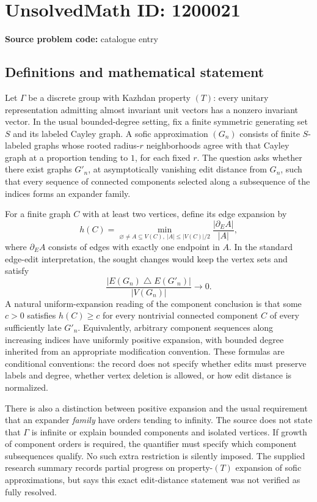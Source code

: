 \documentclass[11pt]{article}
\begin{document}
\section*{UnsolvedMath ID: 1200021}
\textbf{Source problem code:} catalogue entry
\subsection{Definitions and mathematical statement}
Let \(\Gamma\) be a discrete group with Kazhdan property \((T)\): every unitary representation admitting almost invariant unit vectors has a nonzero invariant vector. In the usual bounded-degree setting, fix a finite symmetric generating set \(S\) and its labeled Cayley graph. A sofic approximation \((G_n)\) consists of finite \(S\)-labeled graphs whose rooted radius-\(r\) neighborhoods agree with that Cayley graph at a proportion tending to \(1\), for each fixed \(r\). The question asks whether there exist graphs \(G'_n\), at asymptotically vanishing edit distance from \(G_n\), such that every sequence of connected components selected along a subsequence of the indices forms an expander family.

For a finite graph \(C\) with at least two vertices, define its edge expansion by
\[
h(C)=\min_{\varnothing\ne A\subseteq V(C),\ |A|\le |V(C)|/2}
\frac{|\partial_E A|}{|A|},
\]
where \(\partial_E A\) consists of edges with exactly one endpoint in \(A\). In the standard edge-edit interpretation, the sought changes would keep the vertex sets and satisfy
\[
\frac{|E(G_n)\mathbin{\triangle}E(G'_n)|}{|V(G_n)|}\longrightarrow0.
\]
A natural uniform-expansion reading of the component conclusion is that some \(c>0\) satisfies \(h(C)\ge c\) for every nontrivial connected component \(C\) of every sufficiently late \(G'_n\). Equivalently, arbitrary component sequences along increasing indices have uniformly positive expansion, with bounded degree inherited from an appropriate modification convention. These formulas are conditional conventions: the record does not specify whether edits must preserve labels and degree, whether vertex deletion is allowed, or how edit distance is normalized.

There is also a distinction between positive expansion and the usual requirement that an expander \emph{family} have orders tending to infinity. The source does not state that \(\Gamma\) is infinite or explain bounded components and isolated vertices. If growth of component orders is required, the quantifier must specify which component subsequences qualify. No such extra restriction is silently imposed. The supplied research summary records partial progress on property-\((T)\) expansion of sofic approximations, but says this exact edit-distance statement was not verified as fully resolved.
\end{document}
